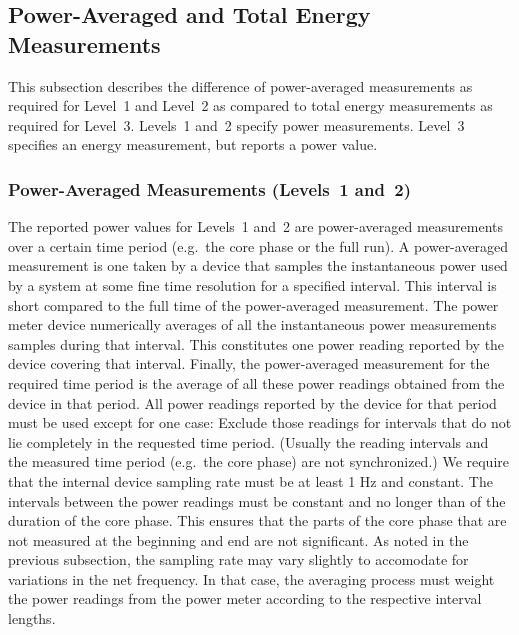 \subsection{Power-Averaged and Total Energy Measurements}
\label{sec:PAaTEM}

\noindent
This subsection describes the difference of power-averaged measurements as required for Level~1 and Level~2 as compared to total energy measurements as required for Level~3.
Levels~1 and~2 specify power measurements.
Level~3 specifies an energy measurement, but reports a power value.
\wl

\subsubsection{Power-Averaged Measurements (Levels~1 and~2)}

\noindent
The reported power values for Levels~1 and~2 are power-averaged measurements over a certain time period (e.g.~the core phase or the full run).
A power-averaged measurement is one taken by a device that samples the instantaneous power used by a system at some fine time resolution for a specified interval.
This interval is short compared to the full time of the power-averaged measurement.
The power meter device numerically averages of all the instantaneous power measurements samples during that interval.
This constitutes one power reading reported by the device covering that interval.
Finally, the power-averaged measurement for the required time period is the average of all these power readings obtained from the device in that period.
All power readings reported by the device for that period must be used except for one case:
Exclude those readings for intervals that do not lie completely in the requested time period.
(Usually the reading intervals and the measured time period (e.g.~the core phase) are not synchronized.)
We require that the internal device sampling rate must be at least 1 Hz and constant.
The intervals between the power readings must be constant and no longer than \MaxReadingIntervalCorePhaseLTwoThree{} of the duration of the core phase.
This ensures that the parts of the core phase that are not measured at the beginning and end are not significant.
As noted in the previous subsection, the sampling rate may vary slightly to accomodate for variations in the net frequency.
In that case, the averaging process must weight the power readings from the power meter according to the respective interval lengths.
\wl


